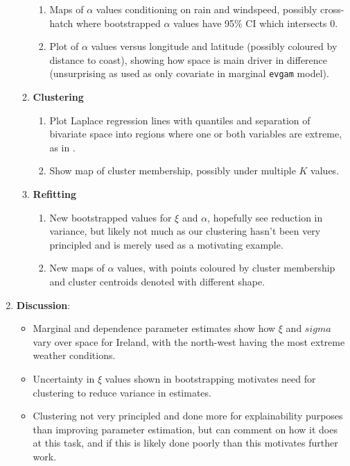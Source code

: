 \documentclass{article}
\numberwithin{equation}{section}
\begin{document}
\begin{enumerate}
\begin{enumerate}
\begin{enumerate}
          \item Maps of $\alpha$ values conditioning on rain and windspeed, possibly cross-hatch where bootstrapped $\alpha$ values have 95\% CI which intersects 0. 
          \item Plot of $\alpha$ values versus longitude and latitude (possibly coloured by distance to coast), showing how space is main driver in difference (unsurprising as used as only covariate in marginal \texttt{evgam} model). 
        \end{enumerate}
      \item \textbf{Clustering}
        \begin{enumerate}
          \item Plot Laplace regression lines with quantiles and separation of bivariate space into regions where one or both variables are extreme, as in \cite{Vignotto2021}. 
          \item Show map of cluster membership, possibly under multiple $K$ values. 
        \end{enumerate} 
      \item \textbf{Refitting}
        \begin{enumerate}
          \item New bootstrapped values for $\xi$ and $\alpha$, hopefully see reduction in variance, but likely not much as our clustering hasn't been very principled and is merely used as a motivating example. 
          \item New maps of $\alpha$ values, with points coloured by cluster membership and cluster centroids denoted with different shape. 
        \end{enumerate}
    \end{enumerate}
  \item \textbf{Discussion}:
    \begin{itemize}
      \item Marginal and dependence parameter estimates show how $\xi$ and $sigma$ vary over space for Ireland, with the north-west having the most extreme weather conditions. 
      \item Uncertainty in $\xi$ values shown in bootstrapping motivates need for clustering to reduce variance in estimates.
      \item Clustering not very principled and done more for explainability purposes than improving parameter estimation, but can comment on how it does at this task, and if this is likely done poorly than this motivates further work. 
    \end{itemize}
\end{enumerate}
\end{document}
